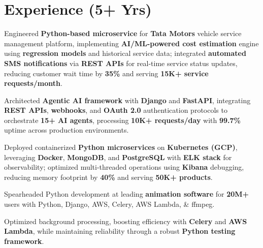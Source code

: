 \documentclass[]{deedy-resume-openfont}
\begin{document}
\begin{minipage}[t]{0.61\textwidth} 


\section{Experience (5+ Yrs)}

\vspace{\topsep} %
\begin{tightemize}
\item Engineered \textbf{Python-based microservice} for \textbf{Tata Motors} vehicle service management platform, implementing \textbf{AI/ML-powered cost estimation} engine using \textbf{regression models} and historical service data; integrated \textbf{automated SMS notifications} via \textbf{REST APIs} for real-time service status updates, reducing customer wait time by \textbf{35\%} and serving \textbf{15K+ service requests/month}.
\item Architected \textbf{Agentic AI framework} with \textbf{Django} and \textbf{FastAPI}, integrating \textbf{REST APIs}, \textbf{webhooks}, and \textbf{OAuth 2.0} authentication protocols to orchestrate \textbf{15+ AI agents}, processing \textbf{10K+ requests/day} with \textbf{99.7\%} uptime across production environments.
\item Deployed containerized \textbf{Python microservices} on \textbf{Kubernetes (GCP)}, leveraging \textbf{Docker}, \textbf{MongoDB}, and \textbf{PostgreSQL} with \textbf{ELK stack} for observability; optimized multi-threaded operations using \textbf{Kibana} debugging, reducing memory footprint by \textbf{40\%} and serving \textbf{50K+ products}.
\end{tightemize}
\sectionsep

\begin{tightemize}
\item Spearheaded Python development at leading \textbf{animation software} for \textbf{20M+} users with Python, Django, AWS, Celery, AWS Lambda, \& ffmpeg.
\item Optimized background processing, boosting efficiency with \textbf{Celery} and \textbf{AWS Lambda}, while maintaining reliability through a robust \textbf{Python testing framework}.
\end{tightemize}
\sectionsep


\end{minipage}
\end{document}
